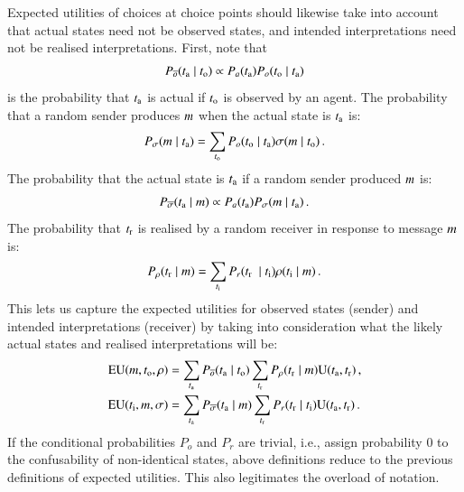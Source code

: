 \documentclass[12pt,english]{article}
\numberwithin{equation}{section}
\begin{document}
\begin{appendices}
Expected utilities of choices at choice points should likewise take into account that actual states
need not be observed states, and intended interpretations need not be realised
interpretations. First, note that
\begin{align*}
  P_{\overline{o}}(t_{\mathrm{a}} \mid t_{\mathrm{o}}) \propto P_a(t_{\mathrm{a}}) P_o(t_{\mathrm{o}}
    \mid t_{\mathrm{a}})
\end{align*}
is the probability that $t_{\mathrm{a}}$ is actual if $t_{\mathrm{o}}$ is observed by an agent. The
probability that a random sender produces $m$ when the actual state is $t_{\mathrm{a}}$ is:
\begin{align*}
  P_{\sigma}(m \mid t_{\mathrm{a}}) = \sum_{t_{\mathrm{o}}} P_o(t_{\mathrm{o}} \mid
  t_{\mathrm{a}}) \sigma(m \mid t_{\mathrm{o}})\,. 
\end{align*}
The probability that the actual state is $t_{\mathrm{a}}$ if a random sender produced $m$ is:
\begin{align*}
  P_{\overline{\sigma}}(t_{\mathrm{a}} \mid m) \propto P_a(t_{\mathrm{a}})
  P_{\sigma}(m \mid t_{\mathrm{a}})\,. 
\end{align*}
The probability that $t_{\mathrm{r}}$ is realised by a random receiver in response to
message $m$ is:
\begin{align*}
  P_{\rho}(t_{\mathrm{r}} \mid m) = \sum_{t_{\mathrm{i}}} P_r(t_{\mathrm{r}} \ \mid
  t_{\mathrm{i}}) \rho(t_{\mathrm{i}} \mid m)\,.
\end{align*}
This lets us capture the expected utilities for observed states (sender) and intended
interpretations (receiver) by taking into consideration what the likely actual states and
realised interpretations will be:
\begin{align*}
  \mathrm{EU}(m , t_{\mathrm{o}}, \rho) & = \sum_{t_{\mathrm{a}}} P_{\overline{o}}(t_{\mathrm{a}}
  \mid t_{\mathrm{o}}) \sum_{t_{\mathrm{r}}} P_{\rho}(t_{\mathrm{r}} \mid
  m) \mathrm{U}(t_{\mathrm{a}}, t_{\mathrm{r}})\,, \\
  \mathrm{EU}(t_{\mathrm{i}}, m, \sigma) & = \sum_{t_{\mathrm{a}}} P_{\overline{\sigma}}(t_{\mathrm{a}}
  \mid m) \sum_{t_{\mathrm{r}}} P_{r}(t_{\mathrm{r}} \mid t_{\mathrm{i}})
  \mathrm{U}(t_{\mathrm{a}}, t_{\mathrm{r}})\,.
\end{align*}
If the conditional probabilities $P_o$ and $P_r$ are trivial, i.e., assign probability 0 to the
confusability of non-identical states, above definitions reduce to the
previous definitions of expected utilities. This also legitimates the overload of notation.



\end{appendices}
\end{document}
